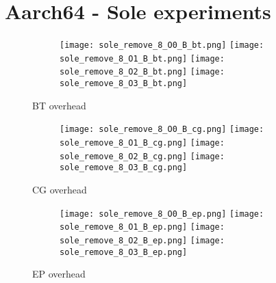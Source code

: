 \documentclass[11pt]{article}
\begin{document}
%
%
    \section*{Aarch64 - Sole experiments}

    \begin{figure}[!ht]
        \begin{subfigure}{\linewidth}
            \texttt{[image: sole\_remove\_8\_O0\_B\_bt.png]}\hfill
            \texttt{[image: sole\_remove\_8\_O1\_B\_bt.png]}\hfill
            \texttt{[image: sole\_remove\_8\_O2\_B\_bt.png]}\hfill
            \texttt{[image: sole\_remove\_8\_O3\_B\_bt.png]}\hfill
        \end{subfigure}\par\medskip
        \caption{BT overhead}
    \end{figure}

    \begin{figure}[!ht]
        \begin{subfigure}{\linewidth}
            \texttt{[image: sole\_remove\_8\_O0\_B\_cg.png]}\hfill
            \texttt{[image: sole\_remove\_8\_O1\_B\_cg.png]}\hfill
            \texttt{[image: sole\_remove\_8\_O2\_B\_cg.png]}\hfill
            \texttt{[image: sole\_remove\_8\_O3\_B\_cg.png]}\hfill
        \end{subfigure}\par\medskip
        \caption{CG overhead}
    \end{figure}
\begin{figure}[!ht]
        \begin{subfigure}{\linewidth}
            \texttt{[image: sole\_remove\_8\_O0\_B\_ep.png]}\hfill
            \texttt{[image: sole\_remove\_8\_O1\_B\_ep.png]}\hfill
            \texttt{[image: sole\_remove\_8\_O2\_B\_ep.png]}\hfill
            \texttt{[image: sole\_remove\_8\_O3\_B\_ep.png]}\hfill
        \end{subfigure}\par\medskip
        \caption{EP overhead}
\end{figure}
\end{document}
